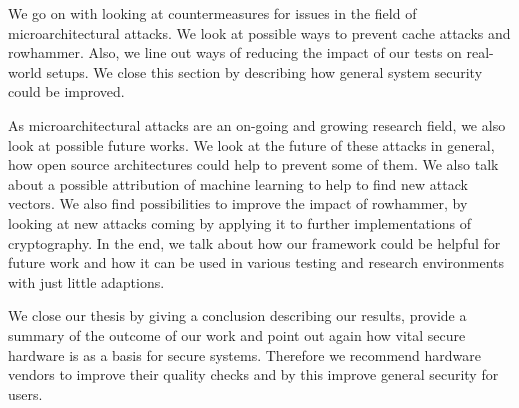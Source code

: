 We go on with looking at countermeasures for issues in the field of
microarchitectural attacks. We look at possible ways to prevent cache attacks
and rowhammer. Also, we line out ways of reducing the impact of our tests on
real-world setups. We close this section by describing how general system
security could be improved.

As microarchitectural attacks are an on-going and growing research field, we
also look at possible future works. We look at the future of these attacks in
general, how open source architectures could help to prevent some of them. We
also talk about a possible attribution of machine learning to help to find new
attack vectors. We also find possibilities to improve the impact of rowhammer,
by looking at new attacks coming by applying it to further implementations of
cryptography. In the end, we talk about how our framework could be helpful for
future work and how it can be used in various testing and research environments
with just little adaptions.

We close our thesis by giving a conclusion describing our results, provide a
summary of the outcome of our work and point out again how vital secure hardware
is as a basis for secure systems. Therefore we recommend hardware vendors to
improve their quality checks and by this improve general security for users.

